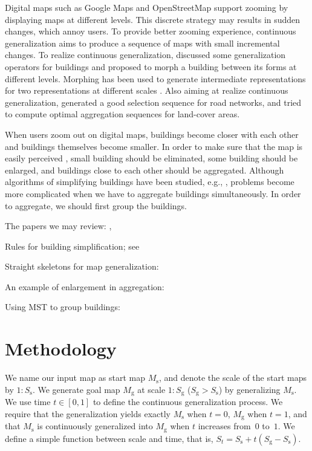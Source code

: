 \documentclass[graybox]{svmult}
\newcommand{\maps}{\ensuremath{M_\mathrm{s}}\xspace}
\newcommand{\mapg}{\ensuremath{M_\mathrm{g}}\xspace}
\begin{document}
Digital maps such as Google Maps and OpenStreetMap support zooming by 
displaying maps at different levels. 
This discrete strategy may results in sudden changes, which annoy users.
To provide better zooming experience, continuous generalization aims to 
produce 
a sequence of maps with small incremental changes.
To realize continuous generalization, \textcite{Sester2005_CG} discussed some 
generalization operators for buildings and proposed to morph a building 
between 
its forms at different levels. Morphing has been used to generate intermediate 
representations for two representations at different scales 
\parencite{mnwb-mpstc-08,Peng2013_LSA,Deng2015,Peng2016_Admin}. 
Also aiming at 
realize continuous generalization, \textcite{Chimani2014_Eat} generated a good 
selection sequence for road networks, and 
\textcite{Peng2017_AStar} tried to compute optimal aggregation sequences for 
land-cover areas.

When users zoom out on digital maps, buildings become closer with each other 
and buildings themselves become smaller. 
In order to make sure that the map is 
easily perceived \parencite{Weibel1997}, small building should be eliminated, 
some building should be enlarged, and buildings close to each other should be 
aggregated.
Although algorithms of simplifying buildings have been studied, e.g., 
\textcite{Buchin2011_Simp,haunertwolff2010}, problems become more complicated 
when we have to aggregate buildings simultaneously.
In order to aggregate, we should first group the buildings.





\bigskip

The papers we may review:   
\textcite{vanSmaalen2003, Buchin2016, Chaudhry2008, Stoter2009},

Rules for building simplification; see \textcite{Lee2005}

Straight skeletons for map generalization: 
\textcite{Gold2003,Matuk2006}


An example of enlargement in aggregation: 

Using MST to group buildings: \textcite{Zhang2013, 
Cetinkaya2015,Deng2017,Regnauld1996}



\section{Methodology}

We name our input map as start map \maps,
and denote the scale of the start maps by $1:S_\mathrm{s}$.
We generate goal map \mapg at scale $1:S_\mathrm{g}$ 
($S_\mathrm{g} > S_\mathrm{s}$) by generalizing \maps. 
We use time $t\in[0,1]$ to define the continuous generalization
process. 
We require that the generalization yields exactly \maps when $t=0$, 
\mapg when $t=1$, 
and that \maps is continuously generalized into \mapg 
when $t$ increases from~$0$ to~$1$.
We define a simple function between scale and time, that is,
$S_t= S_\mathrm{s} + t(S_\mathrm{g}-S_\mathrm{s})$.
\end{document}
